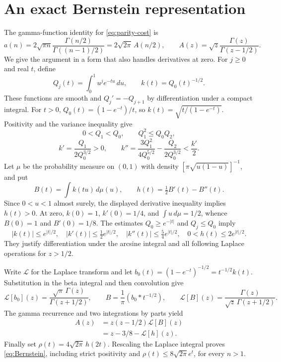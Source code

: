 \documentclass[11pt]{article}
\theoremstyle{remark}\newtheorem{remark}[theorem]{Remark}
\begin{document}
\section{An exact Bernstein representation}\label{app:Bernstein}

The gamma-function identity for \eqref{eq:parity-cost} is
\[
 a(n)=2\sqrt{\pi n}\frac{\Gamma(n/2)}{\Gamma((n-1)/2)}
     =2\sqrt{2\pi}\,A(n/2),\qquad
 A(z)=\sqrt z\frac{\Gamma(z)}{\Gamma(z-1/2)}.
\]
We give the argument in a form that also handles derivatives at zero.
For $j\ge0$ and real $t$, define
\[
 Q_j(t)=\int_0^1u^je^{-tu}\,du,\qquad k(t)=Q_0(t)^{-1/2}.
\]
These functions are smooth and $Q_j'=-Q_{j+1}$ by differentiation
under a compact integral. For $t>0$,
$Q_0(t)=(1-e^{-t})/t$, so $k(t)=\sqrt{t/(1-e^{-t})}$.
Positivity and the variance inequality give
\[
 0<Q_1<Q_0,\qquad Q_1^2\le Q_0Q_2,
\]
\[
 k'=\frac{Q_1}{2Q_0^{3/2}}>0,\qquad
 k''=\frac{3Q_1^2}{4Q_0^{5/2}}-\frac{Q_2}{2Q_0^{3/2}}
       <\frac{k'}2.
\]
Let $\mu$ be the probability measure on $(0,1)$ with density
$[\pi\sqrt{u(1-u)}]^{-1}$, and put
\[
 B(t)=\int k(tu)\,d\mu(u),\qquad h(t)=\tfrac12B'(t)-B''(t).
\]
Since $0<u<1$ almost surely, the displayed derivative inequality
implies $h(t)>0$. At zero, $k(0)=1$, $k'(0)=1/4$, and
$\int u\,d\mu=1/2$, whence $B(0)=1$ and $B'(0)=1/8$.
The estimates $Q_0\ge e^{-|t|}$ and $Q_j\le Q_0$ imply
\[
 |k(t)|\le e^{|t|/2},\quad |k'(t)|\le\tfrac12e^{|t|/2},\quad
 |k''(t)|\le\tfrac54e^{|t|/2},\quad
 0<h(t)\le2e^{|t|/2}.
\]
They justify differentiation under the arcsine integral and all
following Laplace operations for $z>1/2$.

Write $\mathcal L$ for the Laplace transform and let
$b_0(t)=(1-e^{-t})^{-1/2}=t^{-1/2}k(t)$. Substitution in the beta
integral and then convolution give
\[
 \mathcal L[b_0](z)=\frac{\sqrt\pi\,\Gamma(z)}{\Gamma(z+1/2)},
 \qquad B=\frac1\pi(b_0*t^{-1/2}),
 \qquad \mathcal L[B](z)=\frac{\Gamma(z)}{\sqrt z\,\Gamma(z+1/2)}.
\]
The gamma recurrence and two integrations by parts yield
\begin{align*}
 A(z)&=z(z-1/2)\mathcal L[B](z)\\
 &=z-3/8-\mathcal L[h](z).
\end{align*}
Finally set $\rho(t)=4\sqrt{2\pi}\,h(2t)$. Rescaling the Laplace
integral proves \eqref{eq:Bernstein}, including strict positivity and
$\rho(t)\le8\sqrt{2\pi}e^t$, for every $n>1$.
\end{document}
